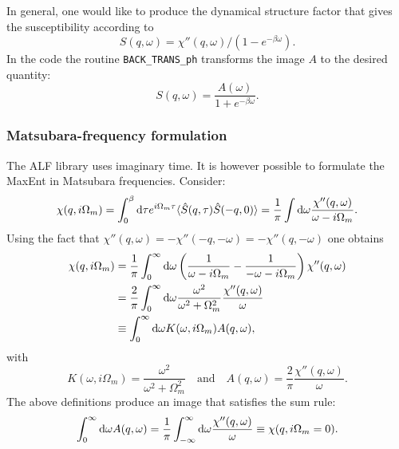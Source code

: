 In general,  one would like to produce the  dynamical structure factor that gives the susceptibility according to
\begin{equation}
 S(q,\omega)  = \chi''(q,\omega)/\left( 1 - e^{-\beta  \omega} \right). 
\end{equation}
In the code the routine \texttt{BACK\_TRANS\_ph} transforms the image $A$ to the desired quantity:
\begin{equation}
	S(q,\omega) = \frac{A(\omega)}{1 + e^{-\beta \omega} } .
\end{equation}
\subsubsection*{Matsubara-frequency formulation}
The ALF  library uses  imaginary time. It is however possible to formulate the MaxEnt in  Matsubara frequencies.
Consider:
\begin{equation}
  \chi(q,i\Omega_m) = \int_0^{\beta} \mathrm{d} \tau  e^{i \Omega_m \tau}
	\langle \hat{S}(q,\tau) \hat{S}(-q,0) \rangle  = \frac{1}{\pi}
   \int \mathrm{d} \omega  \frac{\chi''(q,\omega)}{ \omega - i \Omega_m }.
\end{equation}
Using the fact that $\chi''(q,\omega) = -\chi''(-q,-\omega) = -\chi''(q,-\omega)$ one obtains
\begin{align}
  \chi(q,i\Omega_m) &= 
	\frac{1}{\pi}
   \int_0^{\infty} \mathrm{d} \omega \left(\frac{1}{ \omega - i \Omega_m } - \frac{1}{ -\omega - i \Omega_m } \right)
         \chi''(q,\omega) \nonumber \\ 
    &= \frac{2}{\pi} \int_0^{\infty} \mathrm{d} \omega \frac{\omega^2}{ \omega^2  + \Omega_m^2 } 
  \frac{\chi''(q,\omega)}{\omega} \\
    &\equiv \int_0^{\infty} \mathrm{d} \omega K(\omega,i\Omega_m) A(q,\omega), \nonumber
\end{align}
with
\begin{equation}
   K(\omega,i\Omega_m) = \frac{\omega^2}{ \omega^2  + \Omega_m^2 } \quad \text{and} \quad
A(q,\omega) =  \frac{2}{\pi}   \frac{\chi''(q,\omega)}{\omega} .
\end{equation}
The above definitions produce an image that satisfies the sum rule:
\begin{equation}
\int_0^{\infty} \mathrm{d} \omega A(q,\omega) =  \frac{1}{\pi}  \int_{-\infty}^{\infty} \mathrm{d} \omega 
   \frac{\chi''(q,\omega)}{\omega}   \equiv \chi(q,i\Omega_m=0) .
\end{equation}


